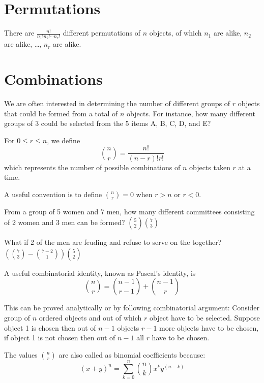\section{Permutations}
\begin{mdframed}
  There are $\frac{n!}{n_1! n_2! \cdots n_r!}$
  different permutations of $n$ objects, of which $n_1$ are alike, $n_2$ are alike, \dots, $n_r$ are alike.
\end{mdframed}

\section{Combinations}
We are often interested in determining the number of different groups of $r$ objects that could be formed from a total of $n$ objects. For instance, how many different
groups of 3 could be selected from the 5 items A, B, C, D, and E?

\begin{mdframed}
  For $0 \le r \le n$, we define
  \[\binom{n}{r} = \frac{n!}{(n-r)! r!}\]
  which represents the number of possible combinations of $n$ objects taken $r$ at a time.
\end{mdframed}

A useful convention is to define $\binom{n}{r} = 0$ when $r>n$ or $r<0$.

\begin{example}
  From a group of 5 women and 7 men, how many different committees consisting of 2 women and 3 men can be formed? \hfill{$\binom{5}{2}\binom{7}{3}$}
  
  What if 2 of the men are feuding and refuse to
  serve on the together? \hfill{$\left(\binom{7}{3}-\binom{7-2}{1}\right)\binom{5}{2}$}
\end{example}

A useful combinatorial identity, known as Pascal's identity, is
\[\binom{n}{r} = \binom{n-1}{r-1} + \binom{n-1}{r}\]

This can be proved analytically or by following combinatorial argument: Consider group of $n$ ordered objects and out of which $r$ object have to be selected. Suppose object 1 is chosen then out of $n-1$ objects $r-1$ more objects have to be chosen, if object 1 is not chosen then out of $n-1$ all $r$ have to be chosen.

The values $\binom{n}{r}$ are also called as binomial coefficients because:
\[ (x+y)^n = \sum_{k=0}^{n} \binom{n}{k}x^k y^{(n-k)}\]